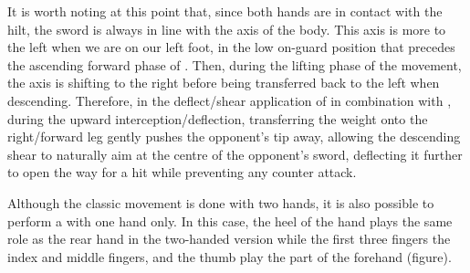 It is worth noting at this point that, since both hands are in contact with the hilt, the sword is always in line with the axis of the body. This axis is more to the left when we are on our left foot, in the low on-guard position that precedes the ascending forward phase of \Duo{}. Then, during the lifting phase of the movement, the axis is shifting to the right before being transferred back to the left when descending. Therefore, in the deflect/shear application of  \Duo{} in combination with \Mo{}, during the upward interception/deflection, transferring the weight onto the right/forward leg gently pushes the opponent's tip away, allowing the descending shear to naturally aim at the centre of the opponent's sword, deflecting it further to open the way for a hit while preventing any counter attack. 


Although the classic movement is done with two hands, it is also possible to perform a \Duo{} with one hand only. In this case, the heel of the hand plays the same role as the rear hand in the two-handed version while the first three fingers \textemdash{} the index and middle fingers, and the thumb \textemdash{} play the part of the forehand (figure). 

